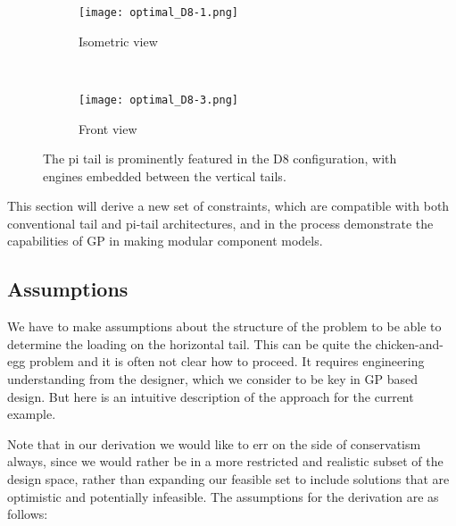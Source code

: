 \begin{figure*}[t!]
    \centering
    \begin{subfigure}[t]{0.5\linewidth}
        \centering
        \texttt{[image: optimal\_D8-1.png]}
        \caption{Isometric view}
    \end{subfigure}%
    ~
    \begin{subfigure}[t]{0.5\linewidth}
        \centering
        \texttt{[image: optimal\_D8-3.png]}
        \caption{Front view}
    \end{subfigure}
    \caption{The pi tail is prominently featured in the D8 configuration, with engines
    embedded between the vertical tails.}
    \label{f:D8}
\end{figure*}

This section will derive a new set of constraints, which are compatible with 
both conventional tail and pi-tail architectures, and in the process demonstrate the
capabilities of \gls{GP} in making modular component models.

\subsection{Assumptions}

We have to make assumptions about the structure of the problem to be able
to determine the loading on the horizontal tail. This can be quite the chicken-and-egg problem
and it is often not clear how to proceed. It requires engineering understanding
from the designer, which we consider to be key in \gls{GP} based design. But here is an
intuitive description of the approach for the current example. 

Note that in our derivation we would like to err on the side of conservatism always, since we would
rather be in a more restricted and realistic subset of the design space, rather than 
expanding our feasible set to include solutions that are optimistic and potentially
infeasible. The assumptions for the derivation are as follows:

